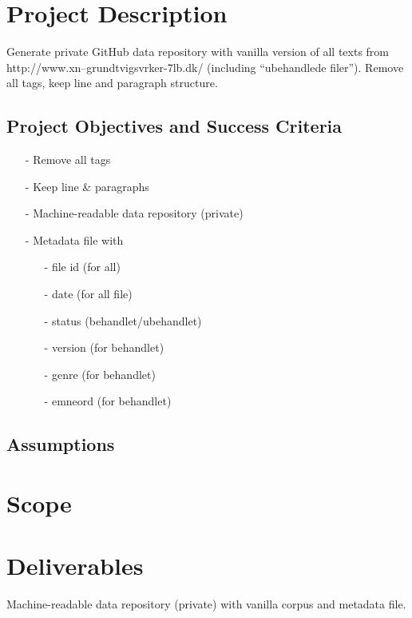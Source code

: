 \documentclass[12pt]{charter}
\begin{document}
\maketitle
\thispagestyle{empty}
\newpage

\section*{Project Description}
\label{sec:description}

Generate private GitHub data repository with vanilla version of all texts from http://www.xn--grundtvigsvrker-7lb.dk/ (including ``ubehandlede filer''). Remove all tags, keep line and paragraph structure. 

	\subsection*{Project Objectives and Success Criteria}
	\label{subsec:objandsuccess}
	\begin{itemize}
		\item[-] Remove all tags
		\item[-] Keep line \& paragraphs
		\item[-] Machine-readable data repository (private)
		\item[-] Metadata file with
			 \begin{itemize}
			 	\item[-] file id (for all)
			 	\item[-] date (for all file)
			 	\item[-] status (behandlet/ubehandlet)
			 	\item[-] version (for behandlet)
			 	\item[-] genre (for behandlet)
			 	\item[-] emneord (for behandlet)
			 \end{itemize}
	\end{itemize}
	
	\subsection*{Assumptions}
	\label{subsec:assumptions}

\section*{Scope}
\label{sec:scope}

\section*{Deliverables}
\label{sec:deliverables}
Machine-readable data repository (private) with vanilla corpus and metadata file.
\end{document}
